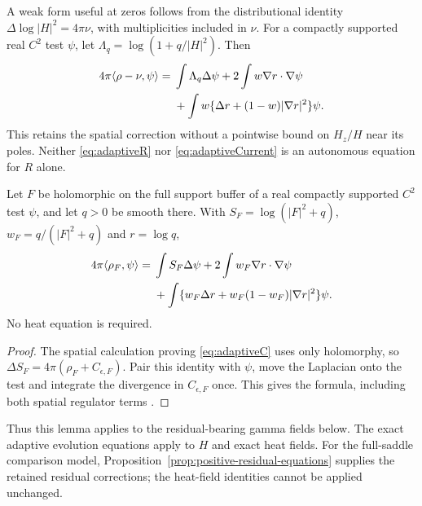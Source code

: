 A weak form useful at zeros follows from the distributional identity
$\Delta\log|H|^2=4\pi\nu$, with multiplicities included in $\nu$.
For a compactly supported real $C^2$ test $\psi$, let
$\Lambda_q=\log(1+q/|H|^2)$. Then
\begin{align}
 4\pi\langle\rho-\nu,\psi\rangle
 ={}&\int\Lambda_q\Delta\psi+2\int w\nabla r\cdot\nabla\psi\notag\\
 &+\int w\{\Delta r+(1-w)|\nabla r|^2\}\psi.
 \label{eq:adaptiveWeak}
\end{align}
This retains the spatial correction without a pointwise bound on
$H_z/H$ near its poles. Neither \eqref{eq:adaptiveR} nor
\eqref{eq:adaptiveCurrent} is an autonomous equation for $R$ alone.

\begin{lemma}\label{lem:holomorphic-weak-density}
Let $F$ be holomorphic on the full support buffer of a real compactly
supported $C^2$ test $\psi$, and let $q>0$ be smooth there. With
$S_F=\log(|F|^2+q)$, $w_F=q/(|F|^2+q)$ and $r=\log q$,
\begin{align}
 4\pi\langle\rho_F,\psi\rangle
 ={}&\int S_F\Delta\psi+2\int w_F\nabla r\cdot\nabla\psi\notag\\
 &+\int\{w_F\Delta r+w_F(1-w_F)|\nabla r|^2\}\psi.
 \label{eq:static-weak-density}
\end{align}
No heat equation is required.
\end{lemma}
\begin{proof}
The spatial calculation proving \eqref{eq:adaptiveC} uses only
holomorphy, so $\Delta S_F=4\pi(\rho_F+C_{\epsilon,F})$.
Pair this identity with $\psi$, move the Laplacian onto the test and
integrate the divergence in $C_{\epsilon,F}$ once. This gives the
formula, including both spatial regulator terms \cite{n28,n30}.
\end{proof}
Thus this lemma applies to the residual-bearing gamma fields below.
The exact adaptive evolution equations apply to $H$ and exact heat
fields. For the full-saddle comparison model,
Proposition~\ref{prop:positive-residual-equations} supplies the retained
residual corrections; the heat-field identities cannot be applied unchanged.
